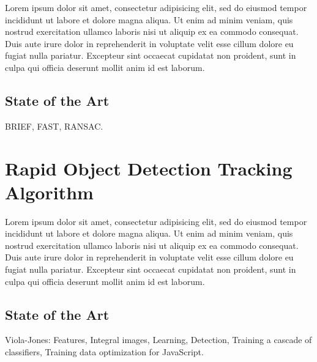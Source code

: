 Lorem ipsum dolor sit amet, consectetur adipisicing elit, sed do eiusmod
tempor incididunt ut labore et dolore magna aliqua. Ut enim ad minim veniam,
quis nostrud exercitation ullamco laboris nisi ut aliquip ex ea commodo
consequat. Duis aute irure dolor in reprehenderit in voluptate velit esse
cillum dolore eu fugiat nulla pariatur. Excepteur sint occaecat cupidatat non
proident, sunt in culpa qui officia deserunt mollit anim id est laborum.

\subsection{State of the Art} %
\label{sub:computer_vision_library_for_the_web:marker_less_tracking_algorithm:state_of_the_art}

BRIEF, FAST, RANSAC.



\section{Rapid Object Detection Tracking Algorithm} %
\label{sec:computer_vision_library_for_the_web:rapid_object_detection_tracking_algorithm}

Lorem ipsum dolor sit amet, consectetur adipisicing elit, sed do eiusmod
tempor incididunt ut labore et dolore magna aliqua. Ut enim ad minim veniam,
quis nostrud exercitation ullamco laboris nisi ut aliquip ex ea commodo
consequat. Duis aute irure dolor in reprehenderit in voluptate velit esse
cillum dolore eu fugiat nulla pariatur. Excepteur sint occaecat cupidatat non
proident, sunt in culpa qui officia deserunt mollit anim id est laborum.

\subsection{State of the Art} %
\label{sub:computer_vision_library_for_the_web:rapid_object_detection_tracking_algorithm:state_of_the_art}

Viola-Jones: Features, Integral images, Learning, Detection, Training a cascade of classifiers, Training data optimization for JavaScript.



